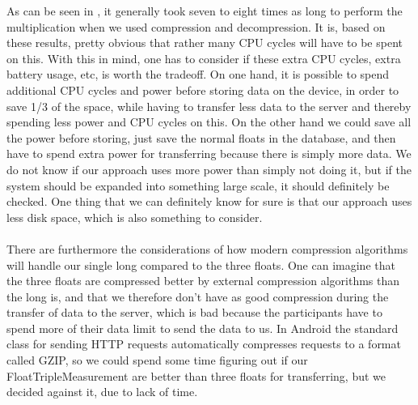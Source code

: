 As can be seen in , it generally took seven to eight times as long to perform the multiplication when we used compression and decompression. It is, based on these results, pretty obvious that rather many CPU cycles will have to be spent on this. With this in mind, one has to consider if these extra CPU cycles, extra battery usage, etc, is worth the tradeoff. On one hand, it is possible to spend additional CPU cycles and power before storing data on the device, in order to save 1/3 of the space, while having to transfer less data to the server and thereby spending less power and CPU cycles on this. On the other hand we could save all the power before storing, just save the normal floats in the database, and then have to spend extra power for transferring because there is simply more data. We do not know if our approach uses more power than simply not doing it, but if the system should be expanded into something large scale, it should definitely be checked. One thing that we can definitely know for sure is that our approach uses less disk space, which is also something to consider. 
\\\\
There are furthermore the considerations of how modern compression algorithms will handle our single long compared to the three floats. One can imagine that the three floats are compressed better by external compression algorithms than the long is, and that we therefore don't have as good compression during the transfer of data to the server, which is bad because the participants have to spend more of their data limit to send the data to us. In Android the standard class for sending HTTP requests automatically compresses requests to a format called GZIP, so we could spend some time figuring out if our FloatTripleMeasurement are better than three floats for transferring, but we decided against it, due to lack of time. 